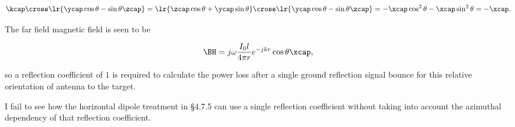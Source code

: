 \begin{dmath}\label{eqn:chapter4Notes:740}
\kcap \cross
\lr{ \ycap \cos\theta - \sin\theta \zcap }
=
\lr{ \zcap \cos\theta + \ycap \sin\theta } \cross
\lr{ \ycap \cos\theta - \sin\theta \zcap }
=
-\xcap \cos^2 \theta - \xcap \sin^2\theta
= -\xcap.
\end{dmath}

The far field magnetic field is seen to be

\begin{dmath}\label{eqn:chapter4Notes:721}
\BH = 
j \omega \frac{I_0 l}{4 \pi r} e^{-j k r}
\cos\theta \xcap,
\end{dmath}

so a reflection coefficient of \( 1 \) is required to calculate the power loss after a single ground reflection signal bounce for this relative orientation of antenna to the target.

I fail to see how the horizontal dipole treatment in \S 4.7.5 can use a single reflection coefficient without taking into account the azimuthal dependency of that reflection coefficient.

